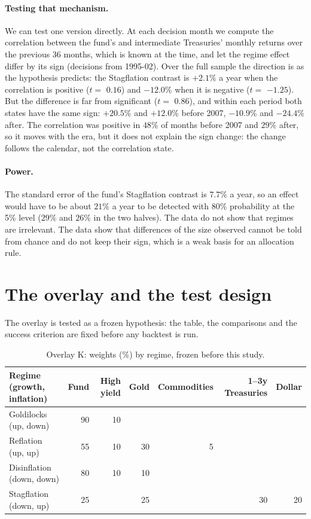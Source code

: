 \documentclass[11pt,a4paper]{article}
\begin{document}
\paragraph{Testing that mechanism.} We can test one version directly. At each decision month we compute the
correlation between the fund's and intermediate Treasuries' monthly returns over the previous 36 months, which is
known at the time, and let the regime effect differ by its sign (decisions from 1995-02). Over the full sample
the direction is as the hypothesis predicts: the Stagflation contrast is $+2.1\%$ a year when the correlation is
positive ($t=$ $0.16$) and $-12.0\%$ when it is negative ($t=$ $-1.25$). But the difference is far from
significant ($t=$ $0.86$), and within each period both states have the same sign: $+20.5\%$ and
$+12.0\%$ before 2007, $-10.9\%$ and $-24.4\%$ after. The correlation was positive in
$48\%$ of months before 2007 and $29\%$ after, so it moves with the era, but it does not explain the
sign change: the change follows the calendar, not the correlation state.

\paragraph{Power.} The standard error of the fund's Stagflation contrast is $7.7\%$ a year, so an effect would
have to be about $21\%$ a year to be detected with 80\% probability at the 5\% level ($29\%$ and
$26\%$ in the two halves). The data do not show that regimes are irrelevant. The data show that differences of
the size observed cannot be told from chance and do not keep their sign, which is a weak basis for an
allocation rule.

\section{The overlay and the test design}
\label{sec:design}

The overlay is tested as a frozen hypothesis: the table, the comparisons and the success criterion are fixed before any backtest is run.


\begin{table}[htbp]
\centering
\caption{Overlay K: weights (\%) by regime, frozen before this study.}
\label{tab:k}
\small
\begin{tabular}{@{}lrrrrrr@{}}
\toprule
Regime (growth, inflation) & Fund & High yield & Gold & Commodities & 1--3y Treasuries & Dollar \\
\midrule
Goldilocks (up, down) & 90 & 10 & & & & \\
Reflation (up, up) & 55 & 10 & 30 & 5 & & \\
Disinflation (down, down) & 80 & 10 & 10 & & & \\
Stagflation (down, up) & 25 & & 25 & & 30 & 20 \\
\bottomrule
\end{tabular}
\end{table}
\end{document}
